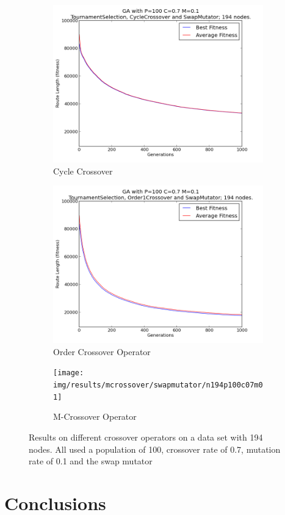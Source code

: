 \documentclass[10pt, a4paper]{article}
\begin{document}
\begin{figure}[h]
\centering
\begin{subfigure}[b]{0.67\textwidth}
\includegraphics[width=\textwidth]{img/results/cyclecrossover/swapmutator/n194p100c07m01}
\caption{Cycle Crossover}
\end{subfigure}

\begin{subfigure}[b]{0.67\textwidth}
\includegraphics[width=\textwidth]{img/results/order1crossover/swapmutator/n194p100c07m01}
\caption{Order Crossover Operator}
\end{subfigure}

\begin{subfigure}[b]{0.67\textwidth}
\texttt{[image: img/results/mcrossover/swapmutator/n194p100c07m01]}
\caption{M-Crossover Operator}
\end{subfigure}

\caption{Results on different crossover operators on a data set with 194 nodes.
         All used a population of 100, crossover rate of 0.7, mutation rate of 
         0.1 and the swap mutator}
\label{fig:time-graph-results}
\end{figure}

\section{Conclusions}




\end{document}
